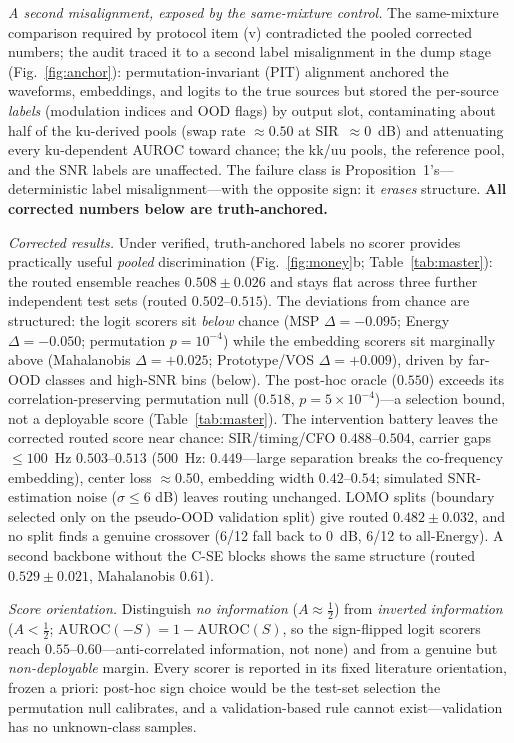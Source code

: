 \documentclass[journal,letterpaper]{IEEEtran}
\begin{document}
\emph{A second misalignment, exposed by the same-mixture control.}
The same-mixture comparison required by protocol item (v) contradicted
the pooled corrected numbers; the audit traced it to a second label
misalignment in the dump stage (Fig.~\ref{fig:anchor}):
permutation-invariant (PIT) alignment anchored the waveforms,
embeddings, and logits to the true sources but stored the per-source
\emph{labels} (modulation indices and OOD flags) by output slot,
contaminating about half of the ku-derived pools (swap rate
$\approx 0.50$ at SIR~$\approx 0$~dB) and attenuating every
ku-dependent AUROC toward chance; the kk/uu pools, the reference pool,
and the SNR labels are unaffected. The failure class is
Proposition~1's---deterministic label misalignment---with the opposite
sign: it \emph{erases} structure. \textbf{All corrected
numbers below are truth-anchored.}

\emph{Corrected results.} Under verified, truth-anchored labels no
scorer provides practically useful \emph{pooled} discrimination
(Fig.~\ref{fig:money}b; Table~\ref{tab:master}): the routed ensemble
reaches $0.508 \pm 0.026$ and stays flat across three further
independent test sets (routed $0.502$--$0.515$). The deviations from
chance are structured: the logit scorers sit \emph{below} chance (MSP
$\Delta = -0.095$; Energy $\Delta = -0.050$; permutation
$p = 10^{-4}$) while the embedding scorers sit marginally above
(Mahalanobis $\Delta = +0.025$; Prototype/VOS $\Delta = +0.009$),
driven by far-OOD classes and high-SNR bins (below). The post-hoc oracle ($0.550$) exceeds its
correlation-preserving permutation null ($0.518$,
$p = 5{\times}10^{-4}$)---a selection bound, not a deployable score
(Table~\ref{tab:master}). The intervention battery leaves the corrected
routed score near chance: SIR/timing/CFO
$0.488$--$0.504$, carrier gaps ${\leq}100$~Hz $0.503$--$0.513$
(\SI{500}{Hz}: $0.449$---large separation breaks the co-frequency
embedding), center loss $\approx 0.50$, embedding width
$0.42$--$0.54$; simulated SNR-estimation noise ($\sigma \leq 6$ dB)
leaves routing unchanged. LOMO splits (boundary
selected only on the pseudo-OOD validation split) give routed
$0.482 \pm 0.032$, and no split finds a genuine crossover (6/12 fall
back to \SI{0}{dB}, 6/12 to all-Energy). A second backbone without the
C-SE blocks shows the same structure (routed $0.529 \pm 0.021$,
Mahalanobis $0.61$).

\emph{Score orientation.} Distinguish \emph{no information} ($A
\approx \tfrac{1}{2}$) from \emph{inverted information} ($A <
\tfrac{1}{2}$; $\mathrm{AUROC}(-S) = 1 - \mathrm{AUROC}(S)$, so the
sign-flipped logit scorers reach $0.55$--$0.60$---anti-correlated
information, not none) and from a genuine but \emph{non-deployable}
margin. Every scorer is reported in its fixed literature orientation,
frozen a priori: post-hoc sign choice would be
the test-set selection the permutation null calibrates, and a
validation-based rule cannot exist---validation has no unknown-class
samples.
\end{document}
